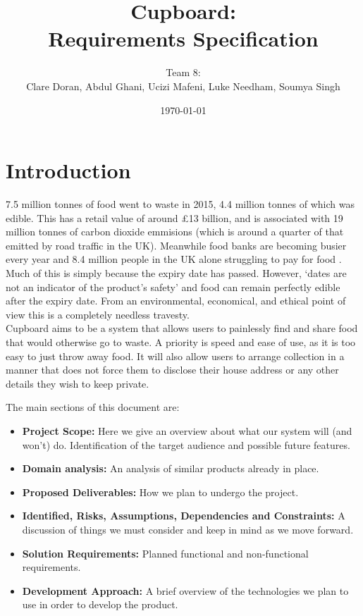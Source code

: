 \documentclass[12pt]{article}
\title{Cupboard:\\Requirements Specification}
\author{Team 8:\\Clare Doran, Abdul Ghani, Ucizi Mafeni, Luke Needham, Soumya Singh}
\date{\today}
\begin{document}
\maketitle

\tableofcontents
\clearpage


\section{Introduction}

7.5 million tonnes of food went to waste in 2015, 4.4 million tonnes of which was edible.
This has a retail value of around £13 billion, and is associated with 19 million tonnes of carbon dioxide emmisions
(which is around a quarter of that emitted by road traffic in the UK)\cite{wrap}.
Meanwhile food banks are becoming busier every year \cite{trussel} and 8.4 million people in the UK alone struggling to pay for food \cite{voth}.\\
Much of this is simply because the expiry date has passed. However, `dates are not an indicator of the product’s safety' \cite{USDA} and food can remain perfectly edible after the expiry date.
From an environmental, economical, and ethical point of view this is a completely needless travesty.\\
Cupboard aims to be a system that allows users to painlessly find and share food
that would otherwise go to waste. A priority is speed and ease of use, as it is
too easy to just throw away food. 
It will also allow users to arrange collection in a manner that does not force
them to disclose their house address or any other details they wish to keep
private.

The main sections of this document are:
\begin{itemize}
	\item \textbf{Project Scope:} Here we give an overview about what our system will (and won't) do. Identification of the target audience and possible future features.
	\item \textbf{Domain analysis:} An analysis of similar products already in place.
	\item \textbf{Proposed Deliverables:} How we plan to undergo the project.
	\item \textbf{Identified, Risks, Assumptions, Dependencies and Constraints:}
        A discussion of things we must consider and keep in mind as we move forward.
	\item \textbf{Solution Requirements:} Planned functional and non-functional requirements.
	\item \textbf{Development Approach:} A brief overview of the technologies we plan to use in order to develop the product.
\end{itemize}
\end{document}
